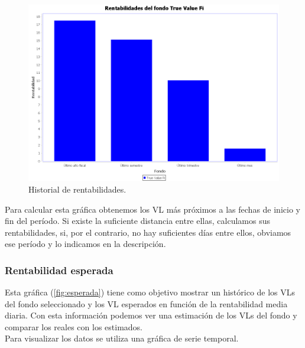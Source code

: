 \documentclass[12pt, a4paper]{book}
\begin{document}
	\begin{figure}[htbp]
	\centering
	\includegraphics[width=\textwidth]{figuras/rentabilidades.PNG}
	\caption{Historial de rentabilidades.}
	\label{fig:rentabilidades}
	\end {figure}

Para calcular esta gráfica obtenemos los \gls{VL} más próximos a las fechas de inicio y fin del período. Si existe la suficiente distancia entre ellas, calculamos sus rentabilidades, si, por el contrario, no hay suficientes días entre ellos, obviamos ese período y lo indicamos en la descripción.

\newpage

\subsubsection{Rentabilidad esperada}

Esta gráfica (\ref{fig:esperada}) tiene como objetivo mostrar un histórico de los \gls{VL}s del fondo seleccionado y los \gls{VL} esperados en función de la rentabilidad media diaria. Con esta información podemos ver una estimación de los \gls{VL}s del fondo y comparar los reales con los estimados.\\

Para visualizar los datos se utiliza una gráfica de serie temporal.
\end{document}
